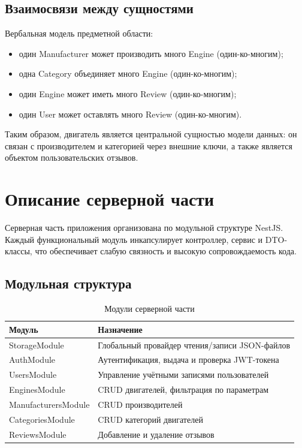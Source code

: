 \documentclass[14pt,a4paper]{extarticle}
\begin{document}
\subsection{Взаимосвязи между сущностями}

Вербальная модель предметной области:
\begin{itemize}
  \item один Manufacturer может производить много Engine (один-ко-многим);
  \item одна Category объединяет много Engine (один-ко-многим);
  \item один Engine может иметь много Review (один-ко-многим);
  \item один User может оставлять много Review (один-ко-многим).
\end{itemize}

Таким образом, двигатель является центральной сущностью модели данных: он связан с производителем и категорией через внешние ключи, а также является объектом пользовательских отзывов.

\newpage

\section{Описание серверной части}

Серверная часть приложения организована по модульной структуре NestJS. Каждый функциональный модуль инкапсулирует контроллер, сервис и DTO-классы, что обеспечивает слабую связность и высокую сопровождаемость кода.

\subsection{Модульная структура}

\begin{table}[h!]
\caption{Модули серверной части}
\begin{tabular}{|p{5cm}|p{9cm}|}
\hline
\textbf{Модуль} & \textbf{Назначение} \\
\hline
StorageModule       & Глобальный провайдер чтения/записи JSON-файлов \\
AuthModule          & Аутентификация, выдача и проверка JWT-токена \\
UsersModule         & Управление учётными записями пользователей \\
EnginesModule       & CRUD двигателей, фильтрация по параметрам \\
ManufacturersModule & CRUD производителей \\
CategoriesModule    & CRUD категорий двигателей \\
ReviewsModule       & Добавление и удаление отзывов \\
\hline
\end{tabular}
\end{table}
\end{document}
